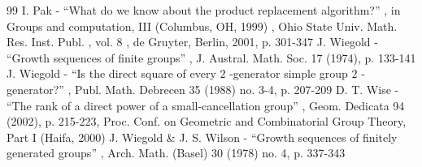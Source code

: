 \documentclass[11pt]{article}
\theoremstyle{definition}
\begin{document}
\begin{thebibliography}{99}
 I. Pak - “What do we know about the product replacement algorithm?” , in Groups and computation, III (Columbus, OH, 1999) , Ohio State Univ. Math. Res. Inst. Publ. , vol. 8 , de Gruyter, Berlin, 2001, p. 301-347
 J. Wiegold - “Growth sequences of finite groups” , J. Austral. Math. Soc. 17 (1974), p. 133-141
 J. Wiegold - “Is the direct square of every $2$ -generator simple group $2$ -generator?” , Publ. Math. Debrecen 35 (1988) no. 3-4, p. 207-209
 D. T. Wise - “The rank of a direct power of a small-cancellation group” , Geom. Dedicata 94 (2002), p. 215-223, Proc. Conf. on Geometric and Combinatorial Group Theory, Part I (Haifa, 2000)
 J. Wiegold \& J. S. Wilson - “Growth sequences of finitely generated groups” , Arch. Math. (Basel) 30 (1978) no. 4, p. 337-343
\end{thebibliography}
\end{document}
